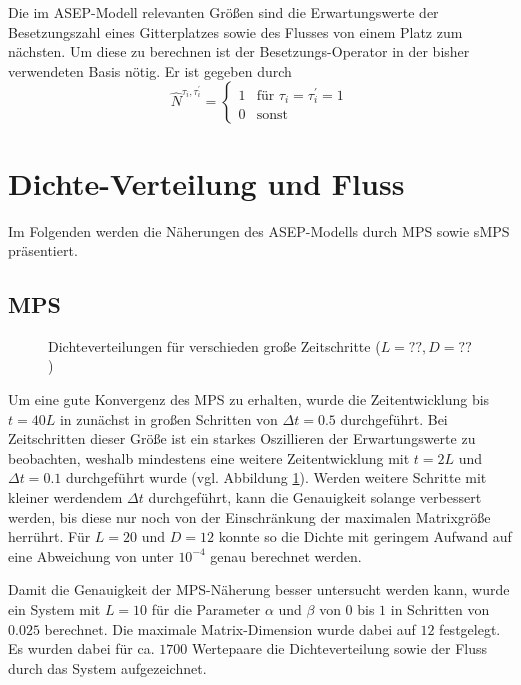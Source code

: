 \documentclass[10pt,a4paper]{report}
\begin{document}
Die im ASEP-Modell relevanten Größen sind die Erwartungswerte der Besetzungszahl eines Gitterplatzes sowie des Flusses von einem Platz zum nächsten. Um diese zu berechnen ist der Besetzungs-Operator in der bisher verwendeten Basis nötig. Er ist gegeben durch
\begin{equation}
\hat{N}^{\tau_i,\tau_i^{\prime}}=
\begin{cases}
1&\text{für }\tau_i=\tau_i^{\prime}=1\\
0&\text{sonst}
\end{cases}
\end{equation}

\section{Dichte-Verteilung und Fluss}
Im Folgenden werden die Näherungen des ASEP-Modells durch MPS sowie sMPS präsentiert. 

\subsection{MPS}

\begin{figure}
\centering
{}
\caption{Dichteverteilungen für verschieden große Zeitschritte ($L=??,D=??$)}
\label{tMPS_time_error_img}
\end{figure}

Um eine gute Konvergenz des MPS zu erhalten, wurde die Zeitentwicklung bis $t=40L$ in zunächst in großen Schritten von $\Delta t=0.5$ durchgeführt. Bei Zeitschritten dieser Größe ist ein starkes Oszillieren der Erwartungswerte zu beobachten, weshalb mindestens eine weitere Zeitentwicklung mit $t=2L$ und $\Delta t=0.1$ durchgeführt wurde (vgl. Abbildung \ref{tMPS_time_error_img}). Werden weitere Schritte mit kleiner werdendem $\Delta t$ durchgeführt, kann die Genauigkeit solange verbessert werden, bis diese nur noch von der Einschränkung der maximalen Matrixgröße herrührt. Für $L=20$ und $D=12$ konnte so die Dichte mit geringem Aufwand auf eine Abweichung von unter $10^{-4}$ genau berechnet werden.



Damit die Genauigkeit der MPS-Näherung besser untersucht werden kann, wurde ein System mit $L=10$ für die Parameter $\alpha$ und $\beta$  von $0$ bis $1$ in Schritten von $0.025$ berechnet. Die maximale Matrix-Dimension wurde dabei auf $12$ festgelegt. Es wurden dabei für ca. $1700$ Wertepaare die Dichteverteilung sowie der Fluss durch das System aufgezeichnet.\\
\end{document}
